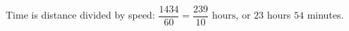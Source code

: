 Time is distance divided by speed: $\dfrac{1434}{60}=\boxed{\dfrac{239}{10}\text{ hours}}$, or $23$ hours $54$ minutes.
